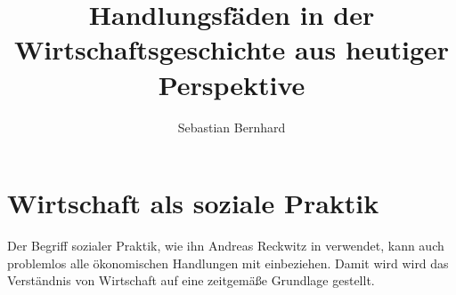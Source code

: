 \documentclass[a4paper]{article}
\begin{document}
\author{Sebastian Bernhard}
\title{Handlungsfäden in der Wirtschaftsgeschichte aus heutiger Perspektive}
\maketitle
\tableofcontents

\section{Wirtschaft als soziale Praktik}

Der Begriff sozialer Praktik, wie ihn Andreas Reckwitz in
\cite{reckwitz2003praktiken} verwendet, kann auch problemlos
alle ökonomischen Handlungen mit einbeziehen. Damit wird
wird das Verständnis von Wirtschaft auf eine zeitgemäße
Grundlage gestellt.





 
\end{document}
